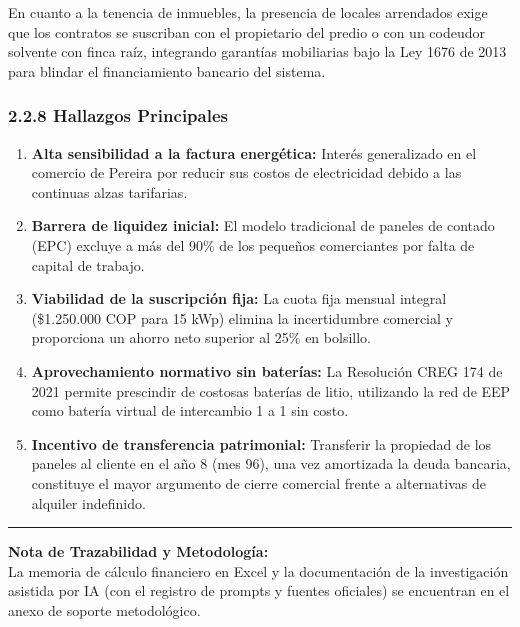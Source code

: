 \documentclass[12pt,letterpaper]{article}
\begin{document}
En cuanto a la tenencia de inmuebles, la presencia de locales arrendados exige que los contratos se suscriban con el propietario del predio o con un codeudor solvente con finca raíz, integrando garantías mobiliarias bajo la Ley 1676 de 2013 para blindar el financiamiento bancario del sistema.

\subsubsection{2.2.8 Hallazgos Principales}

\begin{enumerate}[leftmargin=1.5em, itemsep=1.5pt]
    \item \textbf{Alta sensibilidad a la factura energética:} Interés generalizado en el comercio de Pereira por reducir sus costos de electricidad debido a las continuas alzas tarifarias.
    \item \textbf{Barrera de liquidez inicial:} El modelo tradicional de paneles de contado (EPC) excluye a más del 90\% de los pequeños comerciantes por falta de capital de trabajo.
    \item \textbf{Viabilidad de la suscripción fija:} La cuota fija mensual integral (\$1.250.000 COP para 15 kWp) elimina la incertidumbre comercial y proporciona un ahorro neto superior al 25\% en bolsillo.
    \item \textbf{Aprovechamiento normativo sin baterías:} La Resolución CREG 174 de 2021 permite prescindir de costosas baterías de litio, utilizando la red de EEP como batería virtual de intercambio 1 a 1 sin costo.
    \item \textbf{Incentivo de transferencia patrimonial:} Transferir la propiedad de los paneles al cliente en el año 8 (mes 96), una vez amortizada la deuda bancaria, constituye el mayor argumento de cierre comercial frente a alternativas de alquiler indefinido.
\end{enumerate}

\vspace{0.25cm}
\hrule
\vspace{0.15cm}

\noindent\textbf{\small Nota de Trazabilidad y Metodología:}\\
{\footnotesize La memoria de cálculo financiero en Excel y la documentación de la investigación asistida por IA (con el registro de prompts y fuentes oficiales) se encuentran en el anexo de soporte metodológico.}

\vspace{0.25cm}
\end{document}

